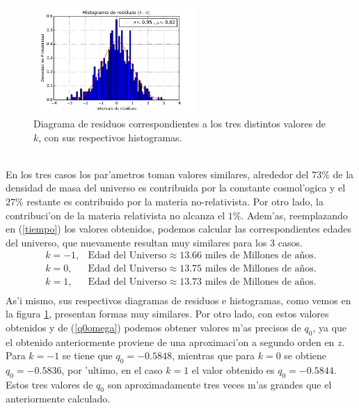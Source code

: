 \begin{figure}[h!]
\includegraphics[width=0.55\textwidth]{fig/gaussk0.pdf}
 \caption{Diagrama de residuos correspondientes a los tres distintos valores de $k$, con sus respectivos histogramas.}
  \label{residuos}
\end{figure}\\
En los tres casos los par'ametros toman valores similares, alrededor del $73\%$ de la densidad de masa del universo es contribuida
por la constante cosmol'ogica y el $27\%$ restante es contribuido por la materia no-relativista. Por otro lado, la contribuci'on
de la materia relativista no alcanza el $1\%$. Adem'as, reemplazando en (\ref{tiempo}) los valores obtenidos, podemos
calcular las correspondientes edades del universo, que nuevamente resultan muy similares para los 3 casos.\\
\begin{equation}
\begin{array}{ll}
k=-1,& \mbox{Edad del Universo} \approx 13.66 \mbox{ miles de Millones de a\~nos}.\\
k=0, & \mbox{Edad del Universo} \approx 13.75 \mbox{ miles de Millones de a\~nos}.\\
k=1, & \mbox{Edad del Universo} \approx 13.73 \mbox{ miles de Millones de a\~nos}.\\
\end{array}
\end{equation}
As'i mismo, sus respectivos diagramas de residuos e histogramas, como vemos en la figura \ref{residuos}, presentan formas muy similares.
Por otro lado, con estos valores obtenidos y de (\ref{q0omega}) podemos obtener valores m'as precisos de $q_0$, ya que el obtenido anteriormente
proviene de una aproximaci'on a segundo orden en $z$. Para $k=-1$ se tiene que $q_0=-0.5848$, mientras que para $k=0$ se obtiene $q_0=-0.5836$, por 'ultimo,
 en el caso $k=1$ el valor obtenido es $ q_0=-0.5844$. Estos tres valores de $q_0$ son aproximadamente tres veces m'as grandes que el anteriormente
 calculado.\\
 
